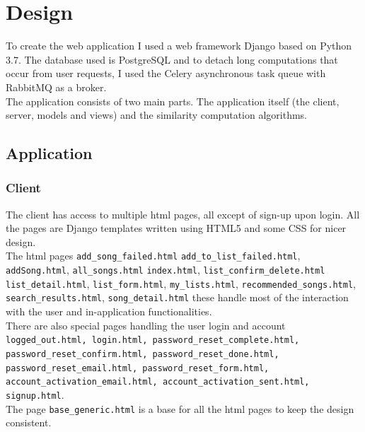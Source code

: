 \section{Design}
 To create the web application I used a web framework Django based on Python 3.7. The database used is PostgreSQL and to detach long computations that occur from user requests, I used the Celery asynchronous task queue with RabbitMQ as a broker.\\
 The application consists of two main parts. The application itself (the client, server, models and views) and the similarity computation algorithms.
 
 \subsection{Application}
 
 \subsubsection{Client}
 
 The client has access to multiple html pages, all except of sign-up upon login. All the pages are Django templates written using HTML5 and some CSS for nicer design. \\
 
 The html pages \texttt{add\_song\_failed.html} \texttt{add\_to\_list\_failed.html}, \texttt{addSong.html}, \texttt{all\_songs.html} \texttt{index.html}, \texttt{list\_confirm\_delete.html} \texttt{list\_detail.html}, \texttt{list\_form.html}, \texttt{my\_lists.html}, \texttt{recommended\_songs.html}, \texttt{search\_results.html}, \texttt{song\_detail.html} these handle most of the interaction with the user and in-application functionalities. \\
 There are also special pages handling the user login and account \texttt{logged\_out.html, login.html, password\_reset\_complete.html, password\_reset\_confirm.html, password\_reset\_done.html, password\_reset\_email.html, password\_reset\_form.html, account\_activation\_email.html, account\_activation\_sent.html, signup.html}. \\
The page \texttt{base\_generic.html} is a base for all the html pages to keep the design consistent.

